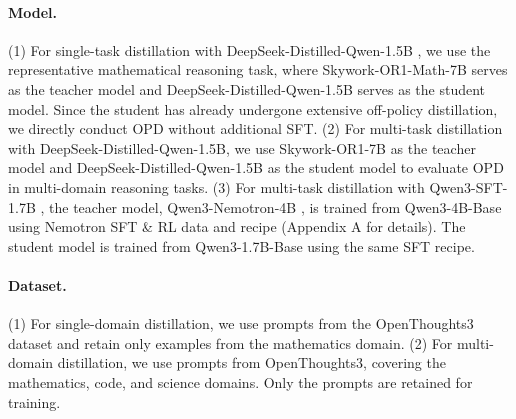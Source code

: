 \documentclass{llmxive}
\providecommand{\cite}[1]{\citep{#1}}
\begin{document}
\paragraph{Model.}
(1) For single-task distillation with DeepSeek-Distilled-Qwen-1.5B \cite{zhang2025100}, we use the representative mathematical reasoning task, where Skywork-OR1-Math-7B \cite{he2025skywork} serves as the teacher model and DeepSeek-Distilled-Qwen-1.5B serves as the student model. Since the student has already undergone extensive off-policy distillation, we directly conduct OPD without additional SFT.
(2) For multi-task distillation with DeepSeek-Distilled-Qwen-1.5B, we use Skywork-OR1-7B \cite{he2025skywork} as the teacher model and DeepSeek-Distilled-Qwen-1.5B as the student model to evaluate OPD in multi-domain reasoning tasks.
(3) For multi-task distillation with Qwen3-SFT-1.7B \cite{wang2026mix}, the teacher model, Qwen3-Nemotron-4B \cite{wang2026mix}, is trained from Qwen3-4B-Base \cite{yang2025qwen3} using Nemotron SFT \& RL data and recipe (Appendix A for details). The student model is trained from Qwen3-1.7B-Base using the same SFT recipe.

\paragraph{Dataset.}
(1) For single-domain distillation, we use prompts from the OpenThoughts3 dataset \cite{guha2025openthoughts} and retain only examples from the mathematics domain.
(2) For multi-domain distillation, we use prompts from OpenThoughts3, covering the mathematics, code, and science domains. Only the prompts are retained for training.
\end{document}
